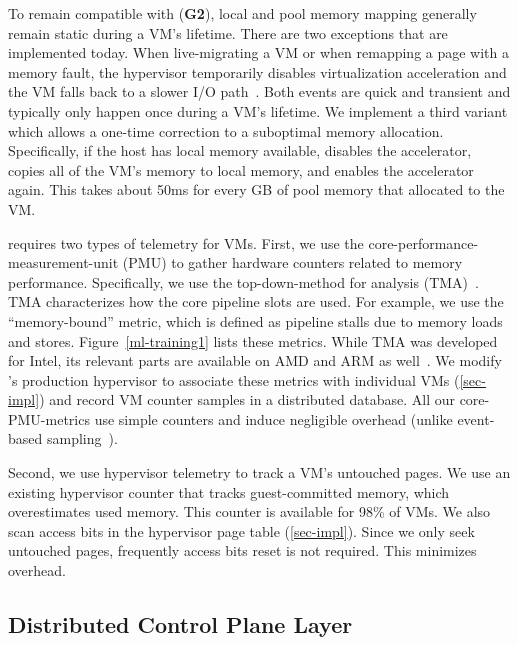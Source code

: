 {


To remain compatible with ({\bf G2}), local and pool memory mapping generally remain static during a VM's lifetime.
There are two exceptions that are implemented today.
When live-migrating a VM or when remapping a page with a memory fault, the hypervisor temporarily disables virtualization acceleration
and the VM falls back to a slower I/O path~\cite{ruprecht2018vm}.
Both events are quick and transient and typically only happen once during a VM's lifetime.
We implement a third variant which allows \sys a one-time correction to a suboptimal memory allocation.
Specifically, if the host has local memory available, \sys disables the accelerator, copies all of the VM's memory to local memory, and enables the accelerator again.
This takes about 50ms for every GB of pool memory that \sys allocated to the VM.


\sys requires two types of telemetry for VMs.
First, we use the core-performance-measurement-unit (PMU) to gather hardware counters related to memory performance.
Specifically, we use the top-down-method for analysis
(TMA)~\cite{topdownanalysis.ispass14,tmam.web21}.
TMA characterizes how the core pipeline slots are used.
For example, we use the ``memory-bound'' metric, which
is defined as pipeline stalls due to memory loads and stores.
Figure~\ref{ml-training1} lists these metrics.
While TMA was developed for Intel, its relevant parts are available on AMD and
ARM as well~\cite{jarus2016top}.
We modify \azure's production hypervisor to associate these metrics with individual
VMs (\sec\ref{sec-impl}) and record VM counter samples in a distributed database.
All our core-PMU-metrics use simple counters and induce negligible overhead (unlike event-based sampling~\cite{akiyama2017quantitative,hemem.sosp21}).

Second, we use hypervisor telemetry to track a VM's untouched pages.
We use an existing hypervisor counter that tracks guest-committed memory, which overestimates used memory.
This counter is available for 98\% of \azure VMs.
We also scan access bits in the hypervisor page table (\sec\ref{sec-impl}).
Since we only seek untouched pages, frequently access bits reset is not required. This minimizes overhead.

\subsection{Distributed Control Plane Layer}
%
\label{sec:design:distributedsw}

}
